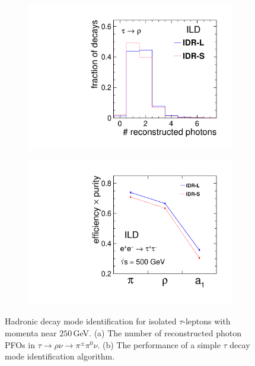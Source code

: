 \begin{figure}[htbp]
\begin{subfigure}{0.49\hsize} 
\includegraphics[width=\textwidth]{Performance/fig/tauID_ngammapfo.pdf}
 \caption{ \label{fig:HLR-tauID:ngamma}}
 \end{subfigure}
\begin{subfigure}{0.49\hsize} 
\includegraphics[width=\textwidth]{Performance/fig/tauID_effPur.pdf}
 \caption{  \label{fig:HLR-tauID:effpur}}
 \end{subfigure}
\caption{Hadronic decay mode identification for isolated $\tau$-leptons with momenta near $250$\,GeV.
(a) The number of reconstructed photon PFOs in  $\tau \to \rho \nu \to \pi^\pm \pi^0 \nu$.
(b) The performance of a simple $\tau$ decay mode identification algorithm.
}
\label{fig:HLR-tauID}
\end{figure}



